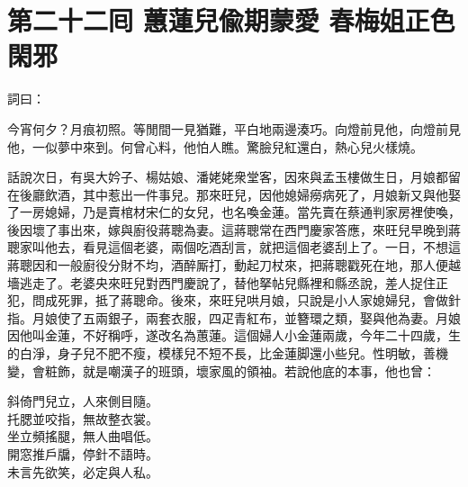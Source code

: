 
\chapter*{第二十二囘 蕙蓮兒偸期蒙愛 春梅姐正色閑邪}


詞曰：

\begin{myquote} 
今宵何夕？月痕初照。等閒間一見猶難，平白地兩邊湊巧。向燈前見他，向燈前見他，一似夢中來到。何曾心料，他怕人瞧。驚臉兒紅還白，熱心兒火樣燒。

\end{myquote} 

話說次日，有吳大妗子、楊姑娘、潘姥姥衆堂客，因來與孟玉樓做生日，月娘都留在後廳飲酒，其中惹出一件事兒。那來旺兒，因他媳婦癆病死了，月娘新又與他娶了一房媳婦，乃是賣棺材宋仁的女兒，也名喚金蓮。{}當先賣在蔡通判家房裡使喚，後因壞了事出來，嫁與廚役蔣聰為妻。這蔣聰常在西門慶家答應，來旺兒早晚到蔣聰家叫他去，看見這個老婆，兩個吃酒刮言，就把這個老婆刮上了。一日，不想這蔣聰因和一般廚役分財不均，酒醉厮打，動起刀杖來，把蔣聰戳死在地，那人便越墻逃走了。老婆央來旺兒對西門慶說了，替他拏帖兒縣裡和縣丞說，差人捉住正犯，問成死罪，抵了蔣聰命。{}後來，來旺兒哄月娘，只說是小人家媳婦兒，會做針指。月娘使了五兩銀子，兩套衣服，四疋青紅布，並簪環之類，娶與他為妻。月娘因他叫金蓮，不好稱呼，遂改名為蕙蓮。這個婦人小金蓮兩歲，今年二十四歲，生的白淨，身子兒不肥不瘦，模樣兒不短不長，比金蓮脚還小些兒。性明敏，善機變，會粧飾，{}就是嘲漢子的班頭，壞家風的領袖。若說他底的本事，他也曾：

\begin{myquote} 
斜倚門兒立，人來側目隨。\\托腮並咬指，無故整衣裳。\\坐立頻搖腿，無人曲唱低。\\開窓推戶牖，停針不語時。{}\\未言先欲笑，必定與人私。
\end{myquote} 

